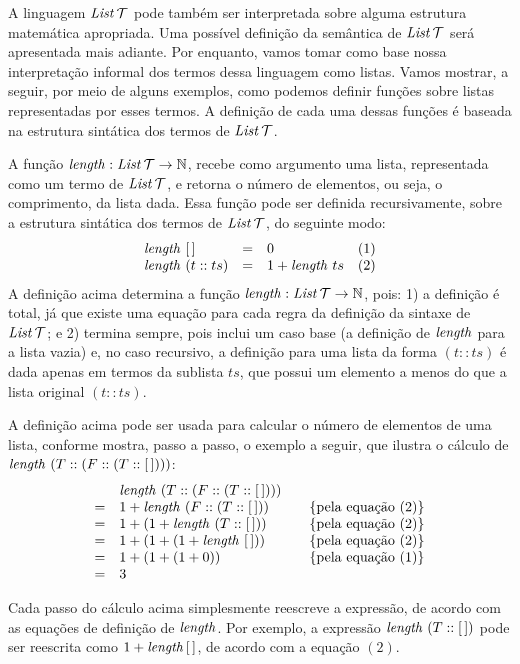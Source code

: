 A linguagem $\textit{List\/}\,\mathcal{T}$ pode também ser interpretada sobre alguma estrutura matemática apropriada. Uma possível definição da  semântica de $\textit{List\/}\,\mathcal{T}$ será  apresentada mais adiante. Por enquanto, vamos tomar como base nossa interpretação informal dos termos dessa linguagem como listas. Vamos mostrar, a seguir, por meio de alguns exemplos, como podemos definir funções sobre listas representadas por esses termos. A definição de cada uma dessas funções é baseada na estrutura sintática dos termos de $\textit{List\/}\,\mathcal{T}$.

\begin{Definition}
A função $\textit{length\/} : \textit{List\/}\,\mathcal{T} \rightarrow \mathbb{N}$, recebe como argumento uma lista, representada como um termo de $\textit{List\/}\,\mathcal{T}$, e retorna o número de elementos, ou seja, o comprimento, da lista dada. Essa função pode ser definida recursivamente, sobre a estrutura sintática dos termos de $\textit{List\/}\,\mathcal{T}$, do seguinte modo:
\[
\begin{array}{lclr}
  \textit{length\/}\,\,[\,] & = & 0 & (1)\\
  \textit{length\/}\,\,(t :: ts) & = & 1 + \textit{length\/}\,\, ts & (2)
\end{array}
\]
A definição acima determina a função $\textit{length\/} : \textit{List\/}\,\mathcal{T} \rightarrow \mathbb{N}$, pois: 1) a definição \'e total, já que existe uma equação para cada regra da definição da sintaxe de $\textit{List\/}\,\mathcal{T}$; e 2) termina sempre, pois inclui um caso base (a definição de $\textit{length\/}$ para a lista vazia) e, no caso recursivo, a definição para uma lista da forma $(t :: ts)$ é dada apenas em termos da sublista $ts$, que possui um elemento a menos do que a lista original $(t::ts)$.
\end{Definition}

\begin{Example}
A definição acima pode ser usada para calcular o n\'umero de elementos de uma lista, conforme mostra, passo a passo, o exemplo a seguir, que ilustra o cálculo de $\textit{length\/}\,\,(T :: (F :: (T :: [\,])))$:
\[
\begin{array}{llcl}
& \length\,\,(T :: (F :: (T :: [\,]))) &  & \\
= &1 + \length\,\,(F :: (T :: [\,]))  & & \{\text{pela equa\c{c}\~ao }(2)\}\\
= &1 + (1 + \length\,\,(T :: [\,]))  &  & \{\text{pela equa\c{c}\~ao }(2)\}\\
= &1 + (1 + (1 + \length\,\,[\,]))  &  & \{\text{pela equa\c{c}\~ao }(2)\}\\
= &1 + (1 + (1 + 0))  &  & \{\text{pela equa\c{c}\~ao }(1)\}\\
= &3                  &   &
\end{array}
\]
\end{Example}
Cada passo do cálculo acima simplesmente reescreve a express\~ao, de acordo com as equa\c{c}\~oes de definição de $\textit{length\/}$. Por exemplo, a expressão $\textit{length\/}\,\,(T :: [\,])$  pode ser reescrita como $1 + \textit{length\/}\, [\,]$, de acordo com a equa\c{c}\~ao $(2)$.


